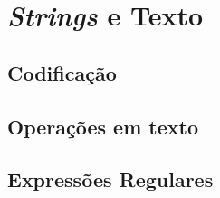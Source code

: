 \chapter{\textit{Strings} e Texto}
    
    \section*{Codificação}

    \section*{Operações em texto}

    \section*{Expressões Regulares}